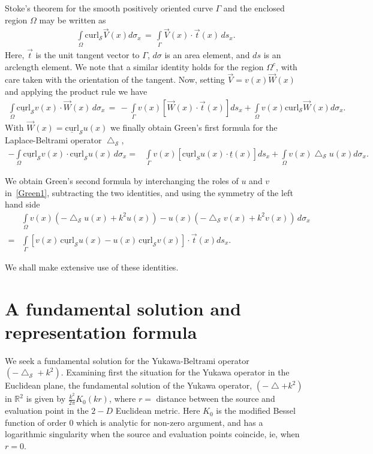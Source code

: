 \documentclass[final]{siamltex}
\newcommand{\lap}{\bigtriangleup}
\renewcommand{\S} {\mathcal{S}}
\begin{document}
Stoke's theorem for the  smooth positively oriented curve $\Gamma$ and the enclosed region
$\Omega$ may be written  as
\begin{align*}
\int\limits_{\Omega} \mbox{curl}_{\S} \vec{V}(x) d\sigma_x \, = \,
\int\limits_\Gamma \vec{V}(x) \cdot \vec{t}(x) \, ds_x .
\end{align*}
Here, $\vec{t}$ is the unit tangent vector to $\Gamma$, $d\sigma$ is an
area element, and $ds$ is an arclength element. We note that a similar
identity holds for the region $\Omega^{c}$, with care taken with the
orientation of the tangent.  Now, setting $\vec{V} = v(x) \vec{W}(x)$
and applying the product rule we have
\begin{align*}
\int\limits_{\Omega} \underline{\mbox{curl}}_{\S} v(x) \cdot
\vec{W}(x) \, d\sigma_x \, = \, 
-\int\limits_{\Gamma} v(x) [\vec{W}(x) \cdot \vec{t}(x)] ds_x +
\int\limits_{\Omega} v(x) \mbox{curl}_{\S} \vec{W}(x) d\sigma_x .
\end{align*}
With $\vec{W}(x) = \underline{\mbox{curl}}_{\S} u(x)$ we finally
obtain Green's first formula for the Laplace-Beltrami operator
$\lap_{\S}$,
\begin{align}
  \label{Green1}
  -\int\limits_{\Omega} \underline{\mbox{curl}}_{\S} v(x) \cdot
  \underline{\mbox{curl}}_{\S} u(x) \, d\sigma_x 
  =& \int\limits_{\Gamma} v(x) [\underline{\mbox{curl}}_S u(x) \cdot 
  \underline{t}(x)] ds_x +\int\limits_{\Omega} v(x) \lap_{\S}u(x) d\sigma_x.
\end{align}

We obtain Green's second formula by interchanging the roles of $u$ and
$v$ in~\eqref{Green1}, subtracting the two identities, and using the
symmetry of the left hand side
\begin{align}
&\int\limits_{\Omega} v(x)(-\lap_{\S}u(x) +k^2 u(x))-
u(x)(-\lap_{\S}v(x) +k^2v(x))\, d\sigma_x \nonumber \\
=&\int\limits_\Gamma [v(x)\,\underline{\mbox{curl}}_{\S} u(x) - u(x)\, \underline{\mbox{curl}}_{\S}v(x)]\cdot \vec{t}(x) ds_x. \label{Green2}
\end{align}

We shall make extensive use of these identities.





\section{A fundamental solution and representation formula}
We seek a fundamental solution for the Yukawa-Beltrami operator
$(-\lap_\S + k^2)$.  Examining first the situation for the Yukawa
operator in the Euclidean plane, the fundamental solution of the Yukawa operator, $(-\lap + k^2)$ in
$\mathbb{R}^2$ is given by $\frac{k^2}{2\pi}
K_{0}(kr)$, where $r=$ distance between the source and evaluation point in the $2-D$ Euclidean metric. Here $K_{0}$ is the modified Bessel function of order 0
which is analytic for non-zero argument, and has a logarithmic
singularity when the source and evaluation points coincide, ie, when $r=0$. 
\end{document}
